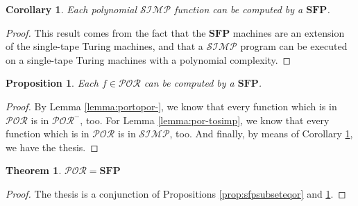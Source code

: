 \documentclass[10pt]{amsart}
\newcommand{\SFP}{\mathbf{SFP}}
\newcommand{\POR}{\mathcal{POR}}
\newcommand{\SIMP}{\mathcal{SIMP}}
\newtheorem{corollary}{Corollary}
\newtheorem{theorem}{Theorem}
\newtheorem{prop}{Proposition}
\begin{document}
\begin{corollary}
\label{lemma:simptosfp}
Each polynomial $\SIMP$ function can be computed by a $\SFP$.
\end{corollary}

\begin{proof}
This result comes from the fact that the $\SFP$ machines are an extension of the single-tape Turing machines, and that a $\SIMP$ program can be executed on a single-tape Turing machines with a polynomial complexity.
\end{proof}

\begin{prop}
\label{prop:porsubseteqsfp}
Each $f \in \POR$ can be computed by a $\SFP$.
\end{prop}
\begin{proof}
By Lemma \ref{lemma:portopor-}, we know that every function which is in $\POR$ is in $\POR^-$, too. For Lemma \ref{lemma:por-tosimp}, we know that every function which is in $\POR$ is in $\SIMP$, too. And finally, by means of Corollary \ref{lemma:simptosfp}, we have the thesis.
\end{proof}

\begin{theorem}
\label{thm:por=sfp}
$\POR=\SFP$
\end{theorem}
\begin{proof}
The thesis is a conjunction of Propositions \ref{prop:sfpsubseteqor} and \ref{prop:porsubseteqsfp}.
\end{proof}
\end{document}
